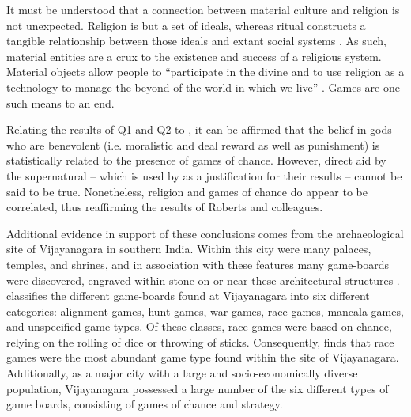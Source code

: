 \documentclass[%
	]{ijsra}
\begin{document}
It must be understood that a connection between material culture and religion is not unexpected. Religion is but a set of ideals, whereas ritual constructs a tangible relationship between those ideals and extant social systems \parencite[14]{bell1992}. As such, material entities are a crux to the existence and success of a religious system. Material objects allow people to ``participate in the divine and to use religion as a technology to manage the beyond of the world in which we live” \parencite[99]{hodder2016}. Games are one such means to an end. 

Relating the results of Q1 and Q2 to \textcite{roberts1959}, it can be affirmed that the belief in gods who are benevolent (i.e. moralistic and deal reward as well as punishment) is statistically related to the presence of games of chance. However, direct aid by the supernatural – which is used by \textcite[602]{roberts1959} as a justification for their results – cannot be said to be true. Nonetheless, religion and games of chance do appear to be correlated, thus reaffirming the results of Roberts and colleagues.

Additional evidence in support of these conclusions comes from the archaeological site of Vijayanagara in southern India. Within this city were many palaces, temples, and shrines, and in association with these features many game-boards were discovered, engraved within stone on or near these architectural structures \parencite[462-463]{rogersdotter2015}. \textcite{rogersdotter2015} classifies the different game-boards found at Vijayanagara into six different categories: alignment games, hunt games, war games, race games, mancala games, and unspecified game types. Of these classes, race games were based on chance, relying on the rolling of dice or throwing of sticks. Consequently, \textcite{rogersdotter2015} finds that race games were the most abundant game type found within the site of Vijayanagara. Additionally, as a major city with a large and socio-economically diverse population, Vijayanagara possessed a large number of the six different types of game boards, consisting of games of chance and strategy. 
\end{document}
